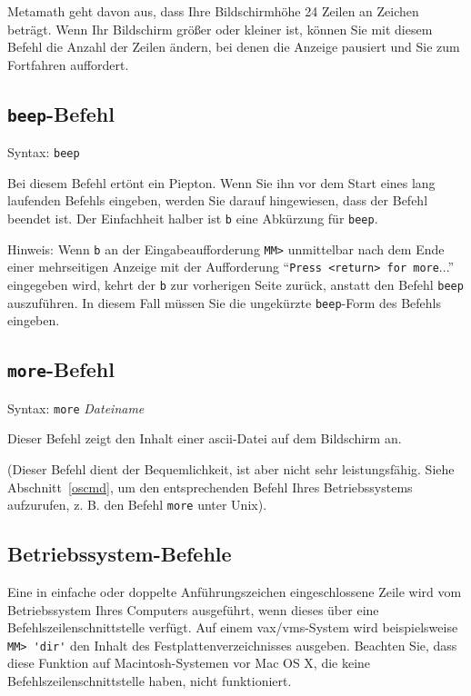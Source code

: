 Metamath geht davon aus, dass Ihre Bildschirmhöhe 24 Zeilen an Zeichen beträgt.  Wenn Ihr Bildschirm größer oder kleiner ist, können Sie mit diesem Befehl die Anzahl der Zeilen ändern, bei denen die Anzeige pausiert und Sie zum Fortfahren auffordert.


\subsection{\texttt{beep}-Befehl}

Syntax:  \texttt{beep}

Bei diesem Befehl ertönt ein Piepton.  Wenn Sie ihn vor dem Start eines lang laufenden Befehls eingeben, werden Sie darauf hingewiesen, dass der Befehl beendet ist.  Der Einfachheit halber ist \texttt{b} eine Abkürzung für \texttt{beep}.

Hinweis: Wenn \texttt{b} an der Eingabeaufforderung \texttt{MM>} unmittelbar nach dem Ende einer mehrseitigen Anzeige mit der Aufforderung "`\texttt{Press <return> for more}..."' eingegeben wird, kehrt der \texttt{b} zur vorherigen Seite zurück, anstatt den Befehl \texttt{beep} auszuführen. In diesem Fall müssen Sie die ungekürzte \texttt{beep}-Form des Befehls eingeben.


\subsection{\texttt{more}-Befehl}

Syntax:  \texttt{more} {\em Dateiname}

Dieser Befehl zeigt den Inhalt einer {\sc ascii}-Datei auf dem Bildschirm an.

(Dieser Befehl dient der Bequemlichkeit, ist aber nicht sehr leistungsfähig.  Siehe Abschnitt~\ref{oscmd}, um den entsprechenden Befehl Ihres Betriebssystems aufzurufen, z. B. den Befehl \texttt{more} unter Unix).


\subsection{Betriebssystem-Befehle}\label{oscmd}

Eine in einfache oder doppelte Anführungszeichen eingeschlossene Zeile wird vom Betriebssystem Ihres Computers ausgeführt, wenn dieses über eine Befehlszeilenschnittstelle verfügt.  Auf einem {\sc vax/vms}-System wird beispielsweise \verb/MM> 'dir'/ den Inhalt des Festplattenverzeichnisses ausgeben.  Beachten Sie, dass diese Funktion auf Macintosh-Systemen vor Mac OS X, die keine Befehlszeilenschnittstelle haben, nicht funktioniert.

